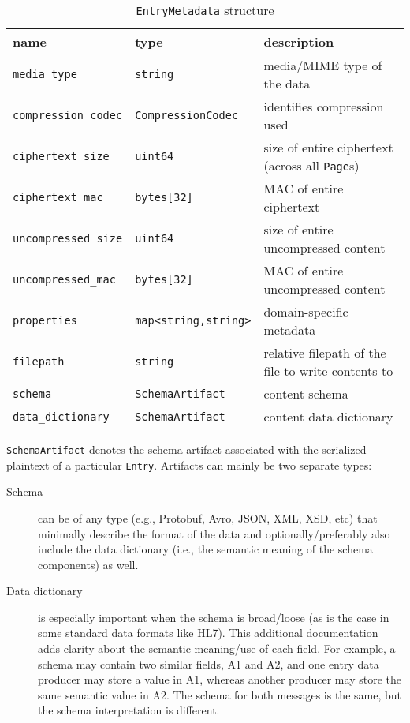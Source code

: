 \documentclass[10pt]{article}
\newcommand{\ttt}[1]{\texttt{#1}}
\def\Entry{\ttt{Entry}}
\def\Page{\ttt{Page}}
\begin{document}
\begin{appendices}
\begin{table}[htbp]
	\caption*{\ttt{EntryMetadata} structure}
	\begin{small}
	\begin{tabular}{lll}
		\toprule
		name & type  & description \\ \midrule
		\ttt{media\_type} & \ttt{string} & media/MIME type of the data \\
		\ttt{compression\_codec} & \ttt{CompressionCodec} & identifies compression used \\
		\ttt{ciphertext\_size} & \ttt{uint64} & size of entire ciphertext (across all \Page{}s) \\
		\ttt{ciphertext\_mac} & \ttt{bytes[32]} & MAC of entire ciphertext \\
		\ttt{uncompressed\_size} & \ttt{uint64} & size of entire uncompressed content \\
		\ttt{uncompressed\_mac} & \ttt{bytes[32]} & MAC of entire uncompressed content \\
		\ttt{properties} & \ttt{map<string,string>} & domain-specific metadata \\
		\ttt{filepath} & \ttt{string} & relative filepath of the file to write contents to \\
		\ttt{schema} & \ttt{SchemaArtifact} & content schema \\
		\ttt{data\_dictionary} & \ttt{SchemaArtifact} & content data dictionary \\
		\bottomrule
	\end{tabular}
	\end{small}
\end{table}

\ttt{SchemaArtifact} denotes the schema artifact associated with the serialized plaintext of a particular \Entry{}. Artifacts can mainly be two separate types:
\begin{description}
	\item [Schema] can be of any type (e.g., Protobuf, Avro, JSON, XML, XSD, etc) that minimally describe the format of the data and optionally/preferably also include the data dictionary (i.e., the semantic meaning of the schema components) as well.
	\item [Data dictionary] is especially important when the schema is broad/loose (as is the case in some standard data formats like HL7). This additional documentation adds clarity about the semantic meaning/use of each field. For example, a schema may contain two similar fields, A1 and A2, and one entry data producer may store a value in A1, whereas another producer may store the same semantic value in A2. The schema for both messages is the same, but the schema interpretation is different.
\end{description}


\end{appendices}
\end{document}
